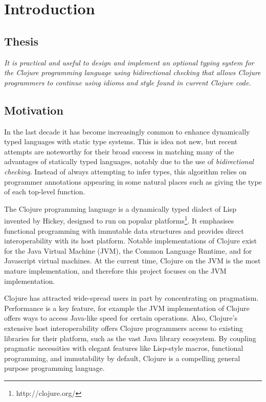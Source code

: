 \chapter{Introduction}

\section{Thesis}

\emph{It is practical and useful to design and implement an optional typing system 
for the Clojure programming language using bidirectional checking that allows Clojure programmers to continue 
using idioms and style found in current Clojure code.}

\section{Motivation}

In the last decade it has become increasingly common to enhance
dynamically typed languages with static type systems. 
This is idea not new, but recent attempts are noteworthy for 
their broad success in matching many of the advantages of statically typed
languages, notably due to the use of \emph{bidirectional checking}.
Instead of always attempting to infer types, this algorithm relies on programmer annotations
appearing in some natural places such as giving the type of each top-level function.

The Clojure programming language is a dynamically typed dialect of Lisp invented
by Hickey, designed to run on popular platforms\footnote{http://clojure.org/}.
It emphasises functional programming with immutable data structures
and provides direct interoperability with its host platform.
Notable implementations of Clojure exist for the Java Virtual Machine (JVM),
the Common Language Runtime, and for Javascript virtual machines.
At the current time, Clojure on the JVM is the most mature implementation,
and therefore this project focuses on the JVM implementation.

Clojure has attracted wide-spread users in part by concentrating on pragmatism.
Performance is a key feature, for example the JVM implementation of Clojure
offers ways to access Java-like speed for certain operations.
Also, Clojure's extensive host interoperability offers Clojure programmers
access to existing libraries for their platform, such as the vast Java library ecosystem.
By coupling pragmatic necessities with elegant features like Lisp-style macros, functional programming,
and immutability by default, Clojure is a compelling general purpose programming language.

